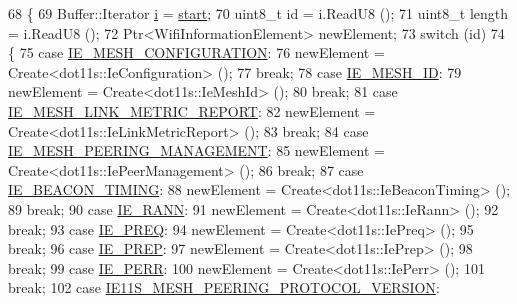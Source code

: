 \begin{DoxyCode}
68 \{
69   Buffer::Iterator \hyperlink{bernuolliDistribution_8m_a6f6ccfcf58b31cb6412107d9d5281426}{i} = \hyperlink{namespacevisualizer_1_1core_a2a35e5d8a34af358b508dac8635754e0}{start};
70   uint8\_t \textcolor{keywordtype}{id} = i.ReadU8 ();
71   uint8\_t length = i.ReadU8 ();
72   Ptr<WifiInformationElement> newElement;
73   \textcolor{keywordflow}{switch} (\textcolor{keywordtype}{id})
74     \{
75     \textcolor{keywordflow}{case} \hyperlink{wifi-information-element_8h_a5a0f69527c958beca1ed4b009614d4a0}{IE\_MESH\_CONFIGURATION}:
76       newElement = Create<dot11s::IeConfiguration> ();
77       \textcolor{keywordflow}{break};
78     \textcolor{keywordflow}{case} \hyperlink{wifi-information-element_8h_ae2847c76aa4afaa18011e77c32a7a752}{IE\_MESH\_ID}:
79       newElement = Create<dot11s::IeMeshId> ();
80       \textcolor{keywordflow}{break};
81     \textcolor{keywordflow}{case} \hyperlink{wifi-information-element_8h_aaa1304d4c4da85d47a2b0f4461eabbfc}{IE\_MESH\_LINK\_METRIC\_REPORT}:
82       newElement = Create<dot11s::IeLinkMetricReport> ();
83       \textcolor{keywordflow}{break};
84     \textcolor{keywordflow}{case} \hyperlink{wifi-information-element_8h_ac165cb06d15fc79753f1bdcc8ac6b734}{IE\_MESH\_PEERING\_MANAGEMENT}:
85       newElement = Create<dot11s::IePeerManagement> ();
86       \textcolor{keywordflow}{break};
87     \textcolor{keywordflow}{case} \hyperlink{wifi-information-element_8h_a69575a38a31ff7556fa0f2e74aaf6dc7}{IE\_BEACON\_TIMING}:
88       newElement = Create<dot11s::IeBeaconTiming> ();
89       \textcolor{keywordflow}{break};
90     \textcolor{keywordflow}{case} \hyperlink{wifi-information-element_8h_a46d8a8db46e528387990a68896ea024a}{IE\_RANN}:
91       newElement = Create<dot11s::IeRann> ();
92       \textcolor{keywordflow}{break};
93     \textcolor{keywordflow}{case} \hyperlink{wifi-information-element_8h_a2d91556437a285af73b9cdfcc30ebbea}{IE\_PREQ}:
94       newElement = Create<dot11s::IePreq> ();
95       \textcolor{keywordflow}{break};
96     \textcolor{keywordflow}{case} \hyperlink{wifi-information-element_8h_a6687bfc3f6a8fca8ae00c46d3e8a3585}{IE\_PREP}:
97       newElement = Create<dot11s::IePrep> ();
98       \textcolor{keywordflow}{break};
99     \textcolor{keywordflow}{case} \hyperlink{wifi-information-element_8h_aea089619cd634dc05b2268c2f9b4a7ee}{IE\_PERR}:
100       newElement = Create<dot11s::IePerr> ();
101       \textcolor{keywordflow}{break};
102     \textcolor{keywordflow}{case} \hyperlink{mesh-information-element-vector_8h_a59b39388f71ac433a6c7932fe4b31c4c}{IE11S\_MESH\_PEERING\_PROTOCOL\_VERSION}:

\end{DoxyCode}
